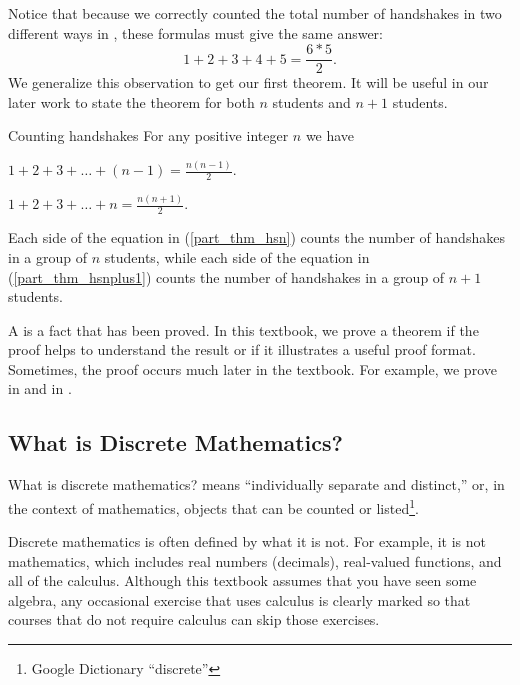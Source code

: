 Notice that because we correctly counted the total number of handshakes in two different ways in , these formulas must give the same answer:
    $$1+2+3+4+5=\frac{6*5}{2}.$$
We generalize this observation to get our first theorem.  It will be useful in our later work to state the theorem for both $n$ students and $n+1$ students.

\begin{thm}{Counting handshakes}
\label{thm_hs}
    For any positive integer $n$ we have
        \begin{apart}
            \item \label{part_thm_hsn} $\displaystyle 1+2+3+\ldots + (n-1) = \frac{n(n-1)}{2}.$
            \item  \label{part_thm_hsnplus1}$\displaystyle1+2+3+\ldots + n = \frac{n(n+1)}{2}.$
        \end{apart}  
\end{thm}

Each side of the equation in  (\ref{part_thm_hsn}) counts the number of handshakes in a group of $n$ students, while each side of the equation in  (\ref{part_thm_hsnplus1}) counts the number of handshakes in a group of $n+1$ students.

A  is a fact that has been proved.  In this textbook, we prove a theorem if the proof helps to understand the result or if it illustrates a useful proof format.  Sometimes, the proof occurs much later in the textbook. For example, we prove  in  and  in .

 
\newcommand{\subdiscrete}{What is Discrete Mathematics?}
\subsection{\subdiscrete}
\label{sub_discrete}

What is discrete mathematics?   means ``individually separate and distinct,'' or, in the context of mathematics, objects that can be counted or listed\footnote{Google Dictionary ``discrete''}.

Discrete mathematics is often defined by what it is not. For example, it is not  mathematics, which includes real numbers (decimals), real-valued functions, and all of the calculus. Although this textbook assumes that you have seen some algebra, any occasional exercise that uses calculus is clearly marked so that courses that do not require calculus can skip those exercises.

